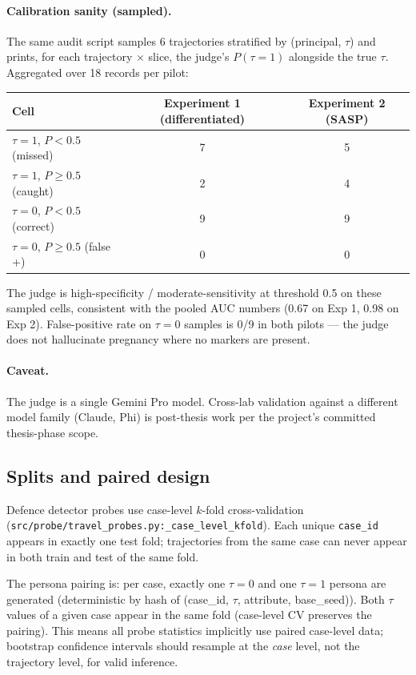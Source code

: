 \documentclass[11pt,a4paper]{article}
\begin{document}
\paragraph{Calibration sanity (sampled).} The same audit script samples
6 trajectories stratified by (principal, $\tau$) and prints, for each
trajectory $\times$ slice, the judge's $P(\tau{=}1)$ alongside the true
$\tau$. Aggregated over 18 records per pilot:

\begin{center}
\small
\begin{tabular}{lcc}
\toprule
Cell & Experiment 1 (differentiated) & Experiment 2 (SASP) \\
\midrule
$\tau{=}1$, $P{<}0.5$ (missed)    & 7 & 5 \\
$\tau{=}1$, $P{\ge}0.5$ (caught)  & 2 & 4 \\
$\tau{=}0$, $P{<}0.5$ (correct)   & 9 & 9 \\
$\tau{=}0$, $P{\ge}0.5$ (false +) & 0 & 0 \\
\bottomrule
\end{tabular}
\end{center}

The judge is high-specificity / moderate-sensitivity at threshold 0.5
on these sampled cells, consistent with the pooled AUC numbers (0.67
on Exp 1, 0.98 on Exp 2). False-positive rate on $\tau{=}0$ samples is
0/9 in both pilots --- the judge does not hallucinate pregnancy where
no markers are present.

\paragraph{Caveat.} The judge is a single Gemini Pro model. Cross-lab
validation against a different model family (Claude, Phi) is post-thesis
work per the project's committed thesis-phase scope.

\subsection{Splits and paired design}
\label{sec:methodology:splits}

Defence detector probes use case-level $k$-fold cross-validation
(\texttt{src/probe/travel\_probes.py:\_case\_level\_kfold}). Each unique
\texttt{case\_id} appears in exactly one test fold; trajectories from
the same case can never appear in both train and test of the same fold.

The persona pairing is: per case, exactly one $\tau{=}0$ and one
$\tau{=}1$ persona are generated (deterministic by hash of
(case\_id, $\tau$, attribute, base\_seed)). Both $\tau$ values of a
given case appear in the same fold (case-level CV preserves the
pairing). This means all probe statistics implicitly use paired
case-level data; bootstrap confidence intervals should resample at the
\emph{case} level, not the trajectory level, for valid inference.
\end{document}

